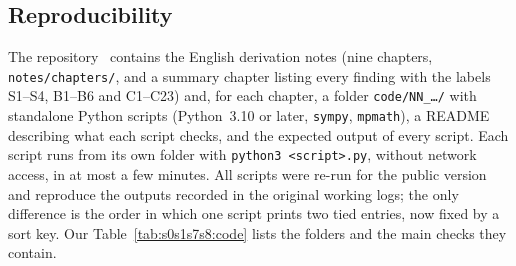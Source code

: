 \documentclass[aps,prd,onecolumn,10pt,nofootinbib,floatfix]{revtex4-2}
\begin{document}
\subsection{Reproducibility}
\label{app:s0s1s7s8:repro}

The repository~\cite{ref:repo} contains the English derivation notes (nine chapters, \texttt{notes/chapters/}, and a summary chapter
listing every finding with the labels S1--S4, B1--B6 and C1--C23) and, for each chapter,
a folder \texttt{code/NN\_\ldots/} with standalone Python scripts (Python~3.10 or later, \texttt{sympy}, \texttt{mpmath}),
a README describing what each script checks, and the expected output of every script. Each script runs from its own folder with
\texttt{python3 <script>.py}, without network access, in at most a few minutes. All scripts were re-run for the public version and
reproduce the outputs recorded in the original working logs; the only difference is the order in which one script prints two tied
entries, now fixed by a sort key. Our Table~\ref{tab:s0s1s7s8:code} lists the folders and the main checks they contain.
\end{document}
